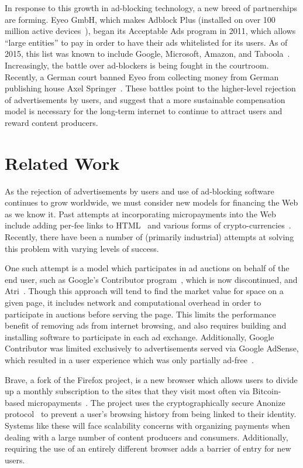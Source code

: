 \documentclass[letterpaper,twocolumn,10pt]{article}
\begin{document}
In response to this growth in ad-blocking technology, a new breed of
partnerships are forming. Eyeo GmbH, which makes Adblock Plus
(installed on over 100 million active devices~\cite{abp}), began its
Acceptable Ads program in 2011, which allows “large entities” to pay
in order to have their ads whitelisted for its users. As of 2015, this
list was known to include Google, Microsoft, Amazon, and
Taboola~\cite{whitelist}. Increasingly, the battle over ad-blockers is
being fought in the courtroom. Recently, a German court banned Eyeo
from collecting money from German publishing house Axel
Springer~\cite{axel}. These battles point to the higher-level
rejection of advertisements by users, and suggest that a more
sustainable compensation model is necessary for the long-term internet
to continue to attract users and reward content producers.

\section{Related Work}
As the rejection of advertisements by users and use of ad-blocking
software continues to grow worldwide, we must consider new models for
financing the Web as we know it. Past attempts at incorporating
micropayments into the Web include adding per-fee links to
HTML~\cite{w3c} and various forms of
crypto-currencies~\cite{peppercoin}. Recently, there have been a
number of (primarily industrial) attempts at solving this problem with
varying levels of success.

One such attempt is a model which participates in ad auctions on
behalf of the end user, such as Google's Contributor
program~\cite{contributor}, which is now discontinued, and
Atri~\cite{atri}. Though this approach will tend to find the market
value for space on a given page, it includes network and computational
overhead in order to participate in auctions before serving the
page. This limits the performance benefit of removing ads from
internet browsing, and also requires building and installing software
to participate in each ad exchange. Additionally, Google Contributor
was limited exclusively to advertisements served via Google AdSense,
which resulted in a user experience which was only partially
ad-free~\cite{adsense}.

Brave, a fork of the Firefox project, is a new browser which allows
users to divide up a monthly subscription to the sites that they visit
most often via Bitcoin-based micropayments~\cite{brave}. The project
uses the cryptographically secure Anonize protocol~\cite{anonize} to
prevent a user's browsing history from being linked to their
identity. Systems like these will face scalability concerns with
organizing payments when dealing with a large number of content
producers and consumers. Additionally, requiring the use of an
entirely different browser adds a barrier of entry for new users.
\end{document}
